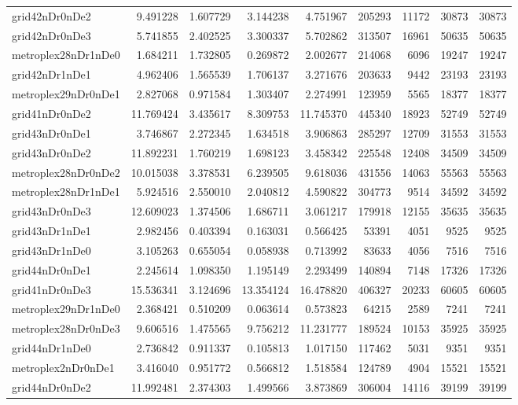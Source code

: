 \documentclass[../../../thesis.tex]{subfiles}
\begin{document}
\begin{longtable}{|l|r|r|r|r|r|r|r|r|}
grid42nDr0nDe2 & 9.491228 & 1.607729 & 3.144238 & 4.751967 & 205293 & 11172 & 30873 & 30873 \\
grid42nDr0nDe3 & 5.741855 & 2.402525 & 3.300337 & 5.702862 & 313507 & 16961 & 50635 & 50635 \\
metroplex28nDr1nDe0 & 1.684211 & 1.732805 & 0.269872 & 2.002677 & 214068 & 6096 & 19247 & 19247 \\
grid42nDr1nDe1 & 4.962406 & 1.565539 & 1.706137 & 3.271676 & 203633 & 9442 & 23193 & 23193 \\
metroplex29nDr0nDe1 & 2.827068 & 0.971584 & 1.303407 & 2.274991 & 123959 & 5565 & 18377 & 18377 \\
grid41nDr0nDe2 & 11.769424 & 3.435617 & 8.309753 & 11.745370 & 445340 & 18923 & 52749 & 52749 \\
grid43nDr0nDe1 & 3.746867 & 2.272345 & 1.634518 & 3.906863 & 285297 & 12709 & 31553 & 31553 \\
grid43nDr0nDe2 & 11.892231 & 1.760219 & 1.698123 & 3.458342 & 225548 & 12408 & 34509 & 34509 \\
metroplex28nDr0nDe2 & 10.015038 & 3.378531 & 6.239505 & 9.618036 & 431556 & 14063 & 55563 & 55563 \\
metroplex28nDr1nDe1 & 5.924516 & 2.550010 & 2.040812 & 4.590822 & 304773 & 9514 & 34592 & 34592 \\
grid43nDr0nDe3 & 12.609023 & 1.374506 & 1.686711 & 3.061217 & 179918 & 12155 & 35635 & 35635 \\
grid43nDr1nDe1 & 2.982456 & 0.403394 & 0.163031 & 0.566425 & 53391 & 4051 & 9525 & 9525 \\
grid43nDr1nDe0 & 3.105263 & 0.655054 & 0.058938 & 0.713992 & 83633 & 4056 & 7516 & 7516 \\
grid44nDr0nDe1 & 2.245614 & 1.098350 & 1.195149 & 2.293499 & 140894 & 7148 & 17326 & 17326 \\
grid41nDr0nDe3 & 15.536341 & 3.124696 & 13.354124 & 16.478820 & 406327 & 20233 & 60605 & 60605 \\
metroplex29nDr1nDe0 & 2.368421 & 0.510209 & 0.063614 & 0.573823 & 64215 & 2589 & 7241 & 7241 \\
metroplex28nDr0nDe3 & 9.606516 & 1.475565 & 9.756212 & 11.231777 & 189524 & 10153 & 35925 & 35925 \\
grid44nDr1nDe0 & 2.736842 & 0.911337 & 0.105813 & 1.017150 & 117462 & 5031 & 9351 & 9351 \\
metroplex2nDr0nDe1 & 3.416040 & 0.951772 & 0.566812 & 1.518584 & 124789 & 4904 & 15521 & 15521 \\
grid44nDr0nDe2 & 11.992481 & 2.374303 & 1.499566 & 3.873869 & 306004 & 14116 & 39199 & 39199 \\

\end{longtable}
\end{document}
